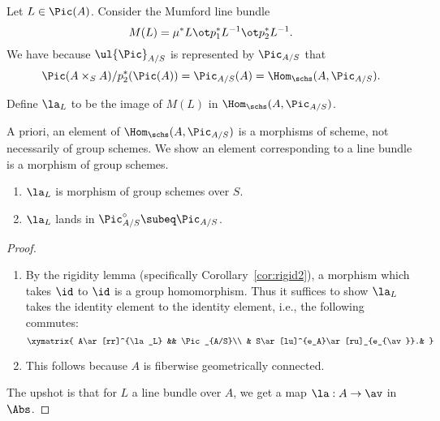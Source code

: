 Let $L\in \Pic(A)$. 
Consider the Mumford line bundle
\[
M(L)=\mu^*L\ot p_1^*L^{-1} \ot p_2^*L^{-1}.
\]
We have because $\ul{\Pic}_{A/S}$ is represented by $\Pic_{A/S}$ that
\[\Pic(A\times_S A)/p_2^*(\Pic(A))=\Pic_{A/S}(A)=\Hom_{\schs}(A,\Pic_{A/S}).\]
\begin{df}
Define $\la_L$ to be the image of $M(L)$ in $\Hom_{\schs}(A,\Pic_{A/S})$.
\end{df}
A priori, an element of  $\Hom_{\schs}(A,\Pic_{A/S})$ is a morphisms of scheme, not necessarily of group schemes. We show an element corresponding to a line bundle is a morphism of group schemes.
\begin{lem}
\begin{enumerate}
\item
$\la_L$ is morphism of group schemes over $S$. 
\item
$\la_L$ lands in $\Pic_{A/S}^{\circ}\subeq \Pic_{A/S}$.
\end{enumerate}
\end{lem}
\begin{proof}
\begin{enumerate}
\item
By the rigidity lemma (specifically Corollary~\ref{cor:rigid2}),  a morphism which takes $\id$ to $\id$ is a group homomorphism. Thus it suffices to show $\la_L$ takes the identity element to the identity element, i.e., the following commutes:
\[
\xymatrix{
A\ar[rr]^{\la_L} && \Pic_{A/S}\\
& S\ar[lu]^{e_A}\ar[ru]_{e_{\av}}.&
}
\]
\item
This follows because $A$ is fiberwise geometrically connected.
\end{enumerate}

The upshot is that for $L$ a line bundle over $A$, we get a map $\la:A\to \av$
 in $\Abs$.
\end{proof}
